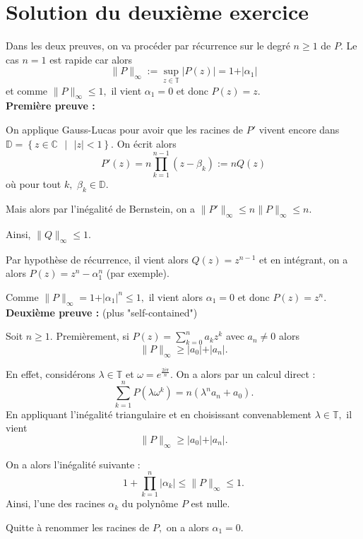 \section{Solution du deuxième exercice}

Dans les deux preuves, on va procéder par récurrence sur le degré $n\geq 1$ de $P.$
Le cas $n=1$ est rapide car alors $$\|P\|_{\infty}:=\sup_{z\in\mathbb{T}}\vert P(z)\vert=1+\vert \alpha_{1} \vert$$ et comme $\|P\|_{\infty}\leq 1,$ il vient $\alpha_{1}=0$ et donc $P(z)=z.$\\

\textbf{Première preuve :}

On applique Gauss-Lucas pour avoir que les racines de $P'$ vivent encore dans $\displaystyle \mathbb{D}=\left\{z\in\mathbb{C}\mbox{ }|\mbox{ } \vert z\vert <1\right\}.$
On écrit alors $$ P'(z)=n\prod_{k=1}^{n-1}(z-\beta_{k}):=nQ(z)$$ où pour tout $k,$ $\beta_{k}\in\mathbb{D}.$

Mais alors par l'inégalité de Bernstein, on a $\displaystyle \|P'\|_{\infty}\leq n\|P\|_{\infty}\leq n.$

Ainsi, $\|Q\|_{\infty}\leq 1.$

Par hypothèse de récurrence, il vient alors $Q(z)=z^{n-1}$ et en intégrant, on a alors $\displaystyle P(z)=z^{n}-\alpha_{1}^{n}$ (par exemple).

Comme $\displaystyle \|P\|_{\infty}=1+\vert \alpha_{1}\vert^{n}\leq 1,$ il vient alors $\alpha_{1}=0$ et donc $P(z)=z^{n}.$\\

\textbf{Deuxième preuve :} (plus "self-contained")

Soit $n\geq 1.$ Premièrement, si $\displaystyle P(z)=\sum_{k=0}^{n}a_{k}z^{k}$ avec $a_{n}\neq 0$ alors $$\|P\|_{\infty}\geq \vert a_{0} \vert + \vert a_{n}\vert.$$

En effet, considérons $\lambda\in\mathbb{T}$ et $\omega=e^{\frac{2i\pi}{n}}.$
On a alors par un calcul direct :  $$\sum_{k=1}^{n}P(\lambda\omega^{k})=n(\lambda^{n}a_{n}+a_{0}).$$
En appliquant l'inégalité triangulaire et en choisissant convenablement $\lambda\in\mathbb{T},$ il vient $$\|P\|_{\infty}\geq \vert a_{0} \vert + \vert a_{n}\vert.$$

On a alors l'inégalité suivante : $$ 1+\prod_{k=1}^{n}\vert \alpha_{k} \vert \leq \|P\|_{\infty} \leq 1.$$
Ainsi, l'une des racines $\alpha_{k}$ du polynôme $P$ est nulle.

Quitte à renommer les racines de $P,$ on a alors $\alpha_{1}=0.$ 

